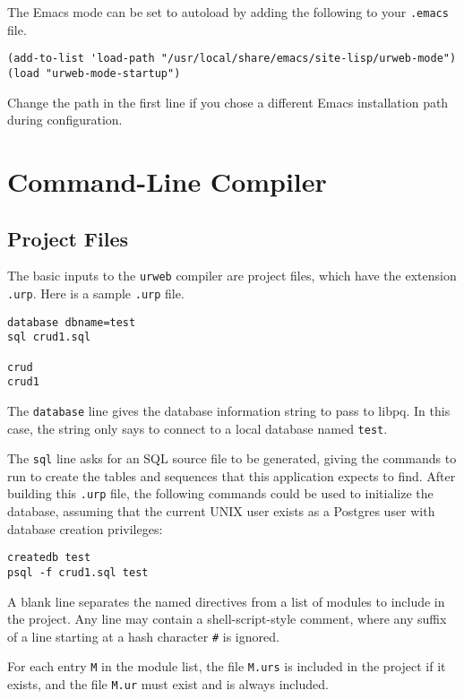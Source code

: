 \documentclass{article}
\begin{document}
The Emacs mode can be set to autoload by adding the following to your \texttt{.emacs} file.

\begin{verbatim}
(add-to-list 'load-path "/usr/local/share/emacs/site-lisp/urweb-mode")
(load "urweb-mode-startup")
\end{verbatim}

Change the path in the first line if you chose a different Emacs installation path during configuration.


\section{Command-Line Compiler}

\subsection{\label{cl}Project Files}

The basic inputs to the \texttt{urweb} compiler are project files, which have the extension \texttt{.urp}.  Here is a sample \texttt{.urp} file.

\begin{verbatim}
database dbname=test
sql crud1.sql

crud
crud1
\end{verbatim}

The \texttt{database} line gives the database information string to pass to libpq.  In this case, the string only says to connect to a local database named \texttt{test}.

The \texttt{sql} line asks for an SQL source file to be generated, giving the commands to run to create the tables and sequences that this application expects to find.  After building this \texttt{.urp} file, the following commands could be used to initialize the database, assuming that the current UNIX user exists as a Postgres user with database creation privileges:

\begin{verbatim}
createdb test
psql -f crud1.sql test
\end{verbatim}

A blank line separates the named directives from a list of modules to include in the project.  Any line may contain a shell-script-style comment, where any suffix of a line starting at a hash character \texttt{\#} is ignored.

For each entry \texttt{M} in the module list, the file \texttt{M.urs} is included in the project if it exists, and the file \texttt{M.ur} must exist and is always included.
\end{document}
